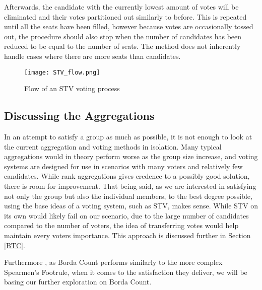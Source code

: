 Afterwards, the candidate with the currently lowest amount of votes will be eliminated and their votes partitioned out similarly to before. This is repeated until all the seats have been filled, however because votes are occasionally tossed out, the procedure should also stop when the number of candidates has been reduced to be equal to the number of seats. The method does not inherently handle cases where there are more seats than candidates.

\begin{figure}
	\centering
	\texttt{[image: STV\_flow.png]}
	\caption{Flow of an STV voting process}
	\label{fig:stvflow}
\end{figure}


\subsection{Discussing the Aggregations}
In an attempt to satisfy a group as much as possible, it is not enough to look at the current aggregation and voting methods in isolation. Many typical aggregations would in theory perform worse as the group size increase, and voting systems are designed for use in scenarios with many voters and relatively few candidates. While rank aggregations gives credence to a possibly good solution, there is room for improvement. That being said, as we are interested in satisfying not only the group but also the individual members, to the best degree possible, using the base ideas of a voting system, such as STV, makes sense. While STV on its own would likely fail on our scenario, due to the large number of candidates compared to the number of voters, the idea of transferring votes would help maintain every voters importance. This approach is discussed further in Section \ref{BTC}.

Furthermore , as Borda Count performs similarly to the more complex Spearmen's Footrule, when it comes to the satisfaction they deliver, we will be basing our further exploration on Borda Count\cite{baltrunas}.